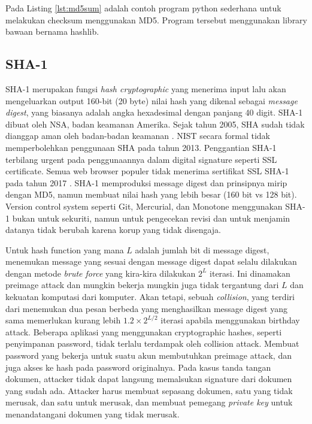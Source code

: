 

Pada Listing \ref{lst:md5sum} adalah contoh program python sederhana untuk melakukan checksum menggunakan MD5. Program tersebut menggunakan library bawaan bernama hashlib.

\subsection{SHA-1}
\label{subsec:SHA1}

SHA-1 merupakan fungsi \emph{hash cryptographic} yang menerima input lalu akan mengeluarkan output 160-bit (20 byte) nilai hash yang dikenal sebagai \emph{message digest}, yang biasanya adalah angka hexadesimal dengan panjang 40 digit. SHA-1 dibuat oleh NSA, badan keamanan Amerika. Sejak tahun 2005, SHA sudah tidak dianggap aman oleh badan-badan keamanan \citep{schneier2005}. NIST secara formal tidak memperbolehkan penggunaan SHA pada tahun 2013. Penggantian SHA-1 terbilang urgent pada penggunaannya dalam digital signature seperti SSL certificate. Semua web browser populer tidak menerima sertifikat SSL SHA-1 pada tahun 2017 \citep{mozilla2019,google2015}. SHA-1 memproduksi message digest dan prinsipnya mirip dengan MD5, namun membuat nilai hash yang lebih besar (160 bit vs 128 bit). Version control system seperti Git, Mercurial, dan Monotone menggunakan SHA-1 bukan untuk sekuriti, namun untuk pengecekan revisi dan untuk menjamin datanya tidak berubah karena korup yang tidak disengaja.

Untuk hash function yang mana \(L\) adalah jumlah bit di message digest, menemukan message yang sesuai dengan message digest dapat selalu dilakukan dengan metode \emph{brute force} yang kira-kira dilakukan \(2^L\) iterasi. Ini dinamakan preimage attack dan mungkin bekerja mungkin juga tidak tergantung dari \(L\) dan kekuatan komputasi dari komputer. Akan tetapi, sebuah \emph{collision}, yang terdiri dari menemukan dua pesan berbeda yang menghasilkan message digest yang sama memerlukan kurang lebih \(1.2\times{2^{L/2}}\) iterasi apabila menggunakan birthday attack. Beberapa aplikasi yang menggunakan cryptographic hashes, seperti penyimpanan password, tidak terlalu terdampak oleh collision attack. Membuat password yang bekerja untuk suatu akun membutuhkan preimage attack, dan juga akses ke hash pada password originalnya. Pada kasus tanda tangan dokumen, attacker tidak dapat langsung memalsukan signature dari dokumen yang sudah ada. Attacker harus membuat sepasang dokumen, satu yang tidak merusak, dan satu untuk merusak, dan membuat pemegang \emph{private key} untuk menandatangani dokumen yang tidak merusak.

